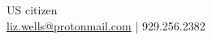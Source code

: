 \documentclass[letterpaper]{deedy-resume-openfont} %
\begin{document}

\lastupdated %

{
US citizen \\
\href{mailto:liz.wells@protonmail.com}{liz.wells@protonmail.com} | 929.256.2382
}

\end{document}
